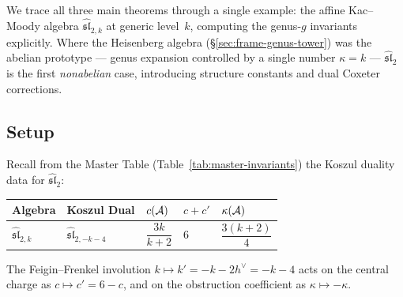 We trace all three main theorems through a single example: the affine Kac--Moody algebra $\widehat{\mathfrak{sl}}_{2,k}$ at generic level~$k$, computing the genus-$g$ invariants explicitly.  Where the Heisenberg algebra (\S\ref{sec:frame-genus-tower}) was the abelian prototype --- genus expansion controlled by a single number $\kappa = k$ --- $\widehat{\mathfrak{sl}}_2$ is the first \emph{nonabelian} case, introducing structure constants and dual Coxeter corrections.

\subsection{Setup}\label{subsec:sl2-genus-setup}

Recall from the Master Table (Table~\ref{tab:master-invariants}) the Koszul duality data for $\widehat{\mathfrak{sl}}_2$:
\begin{center}
\renewcommand{\arraystretch}{1.4}
\begin{tabular}{lllll}
\toprule
Algebra & Koszul Dual & $c(\mathcal{A})$ & $c + c'$ & $\kappa(\mathcal{A})$ \\
\midrule
$\widehat{\mathfrak{sl}}_{2,k}$ & $\widehat{\mathfrak{sl}}_{2,-k-4}$ & $\dfrac{3k}{k+2}$ & $6$ & $\dfrac{3(k+2)}{4}$ \\[6pt]
\bottomrule
\end{tabular}
\end{center}
The Feigin--Frenkel involution $k \mapsto k' = -k - 2h^\vee = -k-4$ acts on the central charge as $c \mapsto c' = 6 - c$, and on the obstruction coefficient as $\kappa \mapsto -\kappa$.


